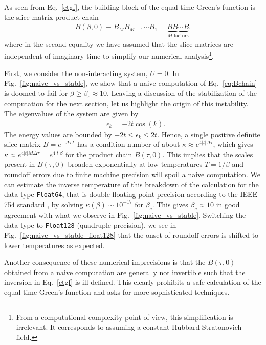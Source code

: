 \documentclass[submission, Phys]{SciPost}
\begin{document}
As seen from Eq.~\eqref{etgf}, the building block of the equal-time Green's function is the slice matrix product chain
\begin{align}
	B(\beta, 0) \equiv B_M B_{M-1} \cdots B_1 = \underbrace{B B \cdots B}_{M \textrm{ factors}}. \label{eq:Bchain}
\end{align}
where in the second equality  we have assumed that the slice matrices are independent of imaginary time to simplify our numerical analysis\footnote{From a computational complexity point of view, this simplification is irrelevant. It corresponds to assuming a constant Hubbard-Stratonovich field.}.

First, we consider the non-interacting system, $U=0$. In Fig.~\ref{fig:naive_vs_stable}, we show that a naive computation of Eq.~\ref{eq:Bchain} is doomed to fail for $\beta \geq \beta_c \approx 10$. Leaving a discussion of the stabilization of the computation for the next section, let us highlight the origin of this instability. The eigenvalues of the system are given by
\begin{align}
	&\epsilon_k = -2t\cos(k).
\end{align}
The energy values are bounded by $-2t \leq \epsilon_k \leq 2t$. Hence, a single positive definite slice matrix $B = e^{-\Delta \tau T}$ has a condition number of about $\kappa \approx e^{4|t|\Delta \tau}$, which gives $\kappa \approx e^{4|t|M\Delta \tau} = e^{4|t|\beta}$ for  the product chain $B(\tau, 0)$. This implies that the scales present in $B(\tau, 0)$ broaden exponentially at low temperatures $T=1/\beta$ and roundoff errors due to finite machine precision will spoil a naive computation. We can estimate the inverse temperature of this breakdown of the calculation for the data type \texttt{Float64}, that is double floating-point precision according to the IEEE 754 standard \cite{Goldberg1991}, by solving $\kappa(\beta) \sim 10^{-17}$ for $\beta_c$. This gives $\beta_c \approx 10$ in good agreement with what we observe in Fig.~\ref{fig:naive_vs_stable}. Switching the data type to \texttt{Float128} (quadruple precision), we see in Fig.~\ref{fig:naive_vs_stable_float128} that the onset of roundoff errors is shifted to lower temperatures as expected.

Another consequence of these numerical imprecisions is that the $B(\tau, 0)$ obtained from a naive computation are generally not invertible such that the inversion in Eq.~\ref{etgf} is ill defined. This clearly prohibits a safe calculation of the equal-time Green's function and asks for more sophisticated techniques.
\end{document}
